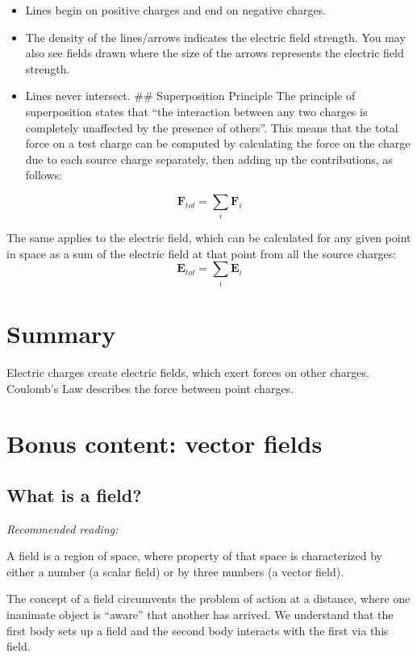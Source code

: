 \documentclass[
  letterpaper,
  DIV=11,
  numbers=noendperiod]{scrreprt}
\providecommand{\tightlist}{%
  \setlength{\itemsep}{0pt}\setlength{\parskip}{0pt}}\usepackage{longtable,booktabs,array}
\begin{document}
\begin{itemize}
\tightlist
\item
  Lines begin on positive charges and end on negative charges.
\item
  The density of the lines/arrows indicates the electric field strength.
  You may also see fields drawn where the size of the arrows represents
  the electric field strength.
\item
  Lines never intersect. \hspace{0pt} \#\# Superposition Principle The
  principle of superposition states that ``the interaction between any
  two charges is completely unaffected by the presence of others''. This
  means that the total force on a test charge can be computed by
  calculating the force on the charge due to each source charge
  separately, then adding up the contributions, as follows:
\end{itemize}

\[ \mathrm{\mathbf{F}}_{tot} = \sum_i \mathrm{\mathbf{F}}_i \]

The same applies to the electric field, which can be calculated for any
given point in space as a sum of the electric field at that point from
all the source charges:
\[ \mathrm{\mathbf{E}}_{tot} = \sum_i \mathrm{\mathbf{E}}_i \]

\section{Summary}\label{summary}

Electric charges create electric fields, which exert forces on other
charges. Coulomb's Law describes the force between point charges.

\section{Bonus content: vector
fields}\label{bonus-content-vector-fields}

\subsection{What is a field?}\label{what-is-a-field}

\emph{Recommended reading:}

A field is a region of space, where property of that space is
characterized by either a number (a scalar field) or by three numbers (a
vector field).

The concept of a field circumvents the problem of action at a distance,
where one inanimate object is ``aware'' that another has arrived. We
understand that the first body sets up a field and the second body
interacts with the first via this field.
\end{document}
